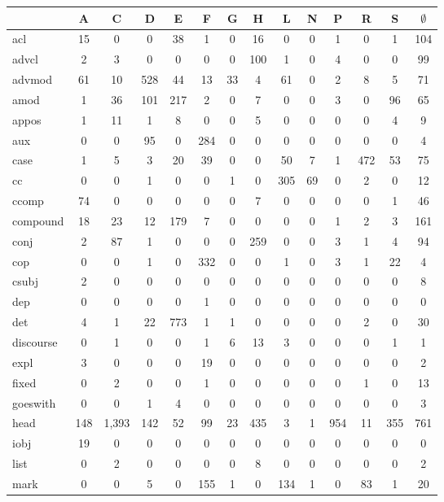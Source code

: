 \documentclass[11pt,a4paper]{article}
\begin{document}
\begin{table}[t]
\centering
\scriptsize
\setlength\tabcolsep{2pt}
\begin{tabular}{l|ccccccccccccc}
 & A & C & D & E & F & G & H & L & N & P & R & S & $\emptyset$ \\
 \hline
acl & 15 & 0 & 0 & 38 & 1 & 0 & 16 & 0 & 0 & 1 & 0 & 1 & 104 \\
advcl & 2 & 3 & 0 & 0 & 0 & 0 & 100 & 1 & 0 & 4 & 0 & 0 & 99 \\
advmod & 61 & 10 & 528 & 44 & 13 & 33 & 4 & 61 & 0 & 2 & 8 & 5 & 71 \\
amod & 1 & 36 & 101 & 217 & 2 & 0 & 7 & 0 & 0 & 3 & 0 & 96 & 65 \\
appos & 1 & 11 & 1 & 8 & 0 & 0 & 5 & 0 & 0 & 0 & 0 & 4 & 9 \\
aux & 0 & 0 & 95 & 0 & 284 & 0 & 0 & 0 & 0 & 0 & 0 & 0 & 4 \\
case & 1 & 5 & 3 & 20 & 39 & 0 & 0 & 50 & 7 & 1 & 472 & 53 & 75 \\
cc & 0 & 0 & 1 & 0 & 0 & 1 & 0 & 305 & 69 & 0 & 2 & 0 & 12 \\
ccomp & 74 & 0 & 0 & 0 & 0 & 0 & 7 & 0 & 0 & 0 & 0 & 1 & 46 \\
compound & 18 & 23 & 12 & 179 & 7 & 0 & 0 & 0 & 0 & 1 & 2 & 3 & 161 \\
conj & 2 & 87 & 1 & 0 & 0 & 0 & 259 & 0 & 0 & 3 & 1 & 4 & 94 \\
cop & 0 & 0 & 1 & 0 & 332 & 0 & 0 & 1 & 0 & 3 & 1 & 22 & 4 \\
csubj & 2 & 0 & 0 & 0 & 0 & 0 & 0 & 0 & 0 & 0 & 0 & 0 & 8 \\
dep & 0 & 0 & 0 & 0 & 1 & 0 & 0 & 0 & 0 & 0 & 0 & 0 & 0 \\
det & 4 & 1 & 22 & 773 & 1 & 1 & 0 & 0 & 0 & 0 & 2 & 0 & 30 \\
discourse & 0 & 1 & 0 & 0 & 1 & 6 & 13 & 3 & 0 & 0 & 0 & 1 & 1 \\
expl & 3 & 0 & 0 & 0 & 19 & 0 & 0 & 0 & 0 & 0 & 0 & 0 & 2 \\
fixed & 0 & 2 & 0 & 0 & 1 & 0 & 0 & 0 & 0 & 0 & 1 & 0 & 13 \\
goeswith & 0 & 0 & 1 & 4 & 0 & 0 & 0 & 0 & 0 & 0 & 0 & 0 & 3 \\
head & 148 & 1,393 & 142 & 52 & 99 & 23 & 435 & 3 & 1 & 954 & 11 & 355 & 761 \\
iobj & 19 & 0 & 0 & 0 & 0 & 0 & 0 & 0 & 0 & 0 & 0 & 0 & 0 \\
list & 0 & 2 & 0 & 0 & 0 & 0 & 8 & 0 & 0 & 0 & 0 & 0 & 2 \\
mark & 0 & 0 & 5 & 0 & 155 & 1 & 0 & 134 & 1 & 0 & 83 & 1 & 20 \\

\end{tabular}
\end{table}
\end{document}
